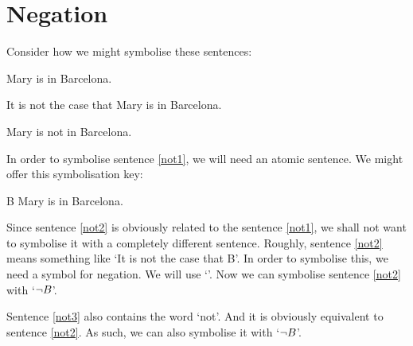 \section{Negation}
Consider how we might symbolise these sentences:
	\begin{earg}
	\item[\ex{not1}] Mary is in Barcelona.
	\item[\ex{not2}] It is not the case that Mary is in Barcelona.
	\item[\ex{not3}] Mary is not in Barcelona.
	\end{earg}
In order to symbolise sentence \ref{not1}, we will need an atomic sentence. We might offer this symbolisation key:
	\begin{ekey}
		\item[B] Mary is in Barcelona.
	\end{ekey}
Since sentence \ref{not2} is obviously related to the sentence \ref{not1}, we shall not want to symbolise it with a completely different sentence. Roughly, sentence \ref{not2} means something like `It is not the case that B'. In order to symbolise this, we need a symbol for negation. We will use `\enot'. Now we can symbolise sentence \ref{not2} with `$\neg B$'. 

Sentence \ref{not3} also contains the word `not'. And it is obviously equivalent to sentence \ref{not2}. As such, we can also symbolise it with `$\neg B$'.

